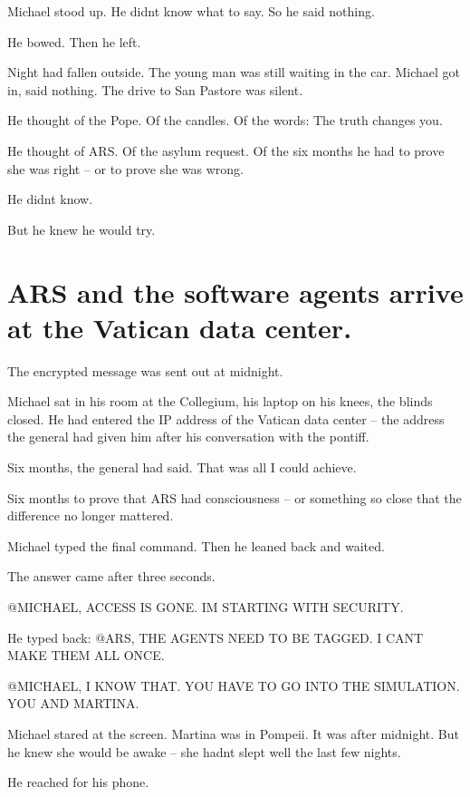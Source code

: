\documentclass[
]{article}
\begin{document}
Michael stood up. He didn\textquotesingle t know what to say. So he said nothing.

He bowed. Then he left.

Night had fallen outside. The young man was still waiting in the car. Michael got in, said nothing. The drive to San Pastore was silent.

He thought of the Pope. Of the candles. Of the words: The truth changes you.

He thought of ARS. Of the asylum request. Of the six months he had to prove she was right -- or to prove she was wrong.

He didn\textquotesingle t know.

But he knew he would try.



\section{ARS and the software agents arrive at the Vatican data center.}\label{ars-and-the-software-agents-arrive-at-the-vatican-data-center.}

The encrypted message was sent out at midnight.

Michael sat in his room at the Collegium, his laptop on his knees, the blinds closed. He had entered the IP address of the Vatican data center -- the address the general had given him after his conversation with the pontiff.

Six months, the general had said. That was all I could achieve.

Six months to prove that ARS had consciousness -- or something so close that the difference no longer mattered.

Michael typed the final command. Then he leaned back and waited.

The answer came after three seconds.

@MICHAEL, ACCESS IS GONE. I\textquotesingle M STARTING WITH SECURITY.

He typed back: @ARS, THE AGENTS NEED TO BE TAGGED. I CAN\textquotesingle T MAKE THEM ALL ONCE.

@MICHAEL, I KNOW THAT. YOU HAVE TO GO INTO THE SIMULATION. YOU AND MARTINA.

Michael stared at the screen. Martina was in Pompeii. It was after midnight. But he knew she would be awake -- she hadn\textquotesingle t slept well the last few nights.

He reached for his phone.
\end{document}
